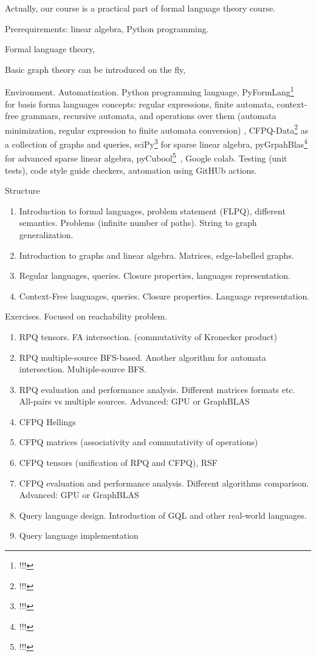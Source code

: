 \documentclass[sigconf]{acmart}
\begin{document}
 Actually, our course is a practical part of formal language theory course.

Prerequirements:  linear algebra, Python programming.

Formal language theory, 

Basic graph theory can be introduced on the fly,

Environment. Automatization. Python programming language, PyFormLang\footnote{!!!}~\cite{10.1145/3408877.3432464} for basis forma languages concepts: regular expressions, finite automata, context-free grammars, recursive automata, and operations over them (automata minimization, regular expression to finite automata conversion) , CFPQ-Data\footnote{!!!} as a collection of graphs and queries, sciPy\footnote{!!!} for sparse linear algebra, pyGrpahBlas\footnote{!!!} for advanced sparse linear algebra, pyCubool\footnote{!!!}~\cite{!!!}, Google colab.
Testing (unit tests), code style guide checkers, automation using GitHUb actions.

Structure
\begin{enumerate}
  \item Introduction to formal languages, problem statement (FLPQ), different semantics. Problems (infinite number of paths). String to graph generalization. 
  \item Introduction to graphs and linear algebra. Matrices, edge-labelled graphs. 
  \item Regular languages, queries. Closure properties, languages representation.
  \item Context-Free languages, queries. Closure properties. Language representation.
\end{enumerate}

Exercises. Focused on reachability problem. 
\begin{enumerate}
  \item RPQ tensors. FA intersection. (commutativity of Kronecker product)
  \item RPQ multiple-source BFS-based. Another algorithm for automata intersection. Multiple-source BFS.  
  \item RPQ evaluation and performance analysis. Different matrices formats etc. All-pairs vs multiple sources. Advanced: GPU or GraphBLAS
  \item CFPQ Hellings
  \item CFPQ matrices (associativity and commutativity of operations)
  \item CFPQ tensors (unification of RPQ and CFPQ), RSF
  \item CFPQ evaluation and performance analysis. Different algorithms comparison. Advanced: GPU or GraphBLAS 
  \item Query language design. Introduction of GQL and other real-world languages. 
  \item Query language implementation
\end{enumerate}
\end{document}
